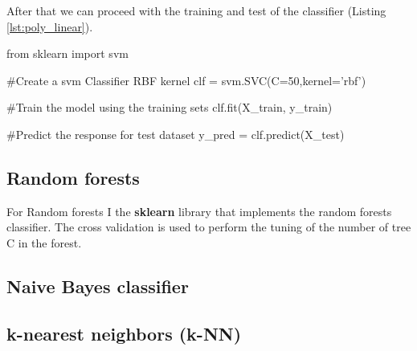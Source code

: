 \documentclass[12pt]{article}
\begin{document}
After that we can proceed with the training and test of the classifier 
(Listing \ref{lst:poly_linear}).

\begin{python}[caption={SVM RBF kernel},label={lst:rbf_linear}]
from sklearn import svm

#Create a svm Classifier RBF kernel
clf = svm.SVC(C=50,kernel='rbf') 

#Train the model using the training sets
clf.fit(X_train, y_train)

#Predict the response for test dataset
y_pred = clf.predict(X_test)
\end{python}


\subsection{Random forests}
For Random forests I the \textbf{sklearn} library that implements the random 
forests classifier.
The cross validation is used to perform the tuning of the number of tree C in the 
forest.

\subsection{Naive Bayes classifier}
\subsection{k-nearest neighbors (k-NN)}
\end{document}
